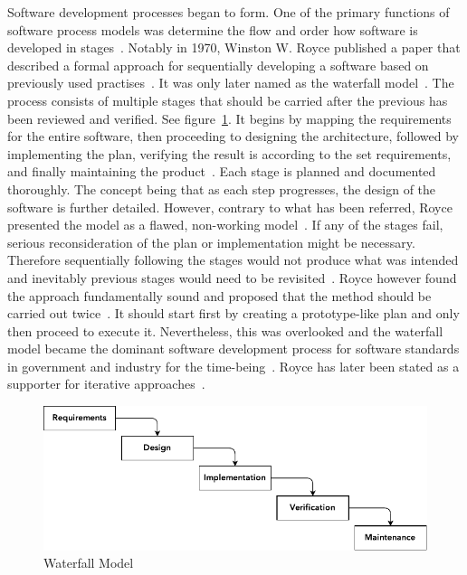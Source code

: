 \documentclass[english]{tktltiki2}
\begin{document}
Software development processes began to form. One of the primary functions of software process models was determine the flow and order how software is developed in stages~\cite{Boe88}. Notably in 1970, Winston W. Royce published a paper that described a formal approach for sequentially developing a software based on previously used practises~\cite{Roy70}. It was only later named as the waterfall model~\cite{Boe88, LB03}. The process consists of multiple stages that should be carried after the previous has been reviewed and verified. See figure~\ref{figure:waterfall-model}. It begins by mapping the requirements for the entire software, then proceeding to designing the architecture, followed by implementing the plan, verifying the result is according to the set requirements, and finally maintaining the product~\cite{Roy70}. Each stage is planned and documented thoroughly. The concept being that as each step progresses, the design of the software is further detailed. However, contrary to what has been referred, Royce presented the model as a flawed, non-working model~\cite{Roy70}. If any of the stages fail, serious reconsideration of the plan or implementation might be necessary. Therefore sequentially following the stages would not produce what was intended and inevitably previous stages would need to be revisited~\cite{Roy70}. Royce however found the approach fundamentally sound and proposed that the method should be carried out twice~\cite{Roy70, Boe88}. It should start first by creating a prototype-like plan and only then proceed to execute it. Nevertheless, this was overlooked and the waterfall model became the dominant software development process for software standards in government and industry for the time-being~\cite{Boe88, LB03}. Royce has later been stated as a supporter for iterative approaches~\cite{LB03}.

\begin{figure}[h!]

    \vspace{1cm}
    \centering

    \includegraphics{figures/waterfall-model}

    \caption{Waterfall Model}
    \label{figure:waterfall-model}

    \vspace{1cm}

\end{figure}
\end{document}
